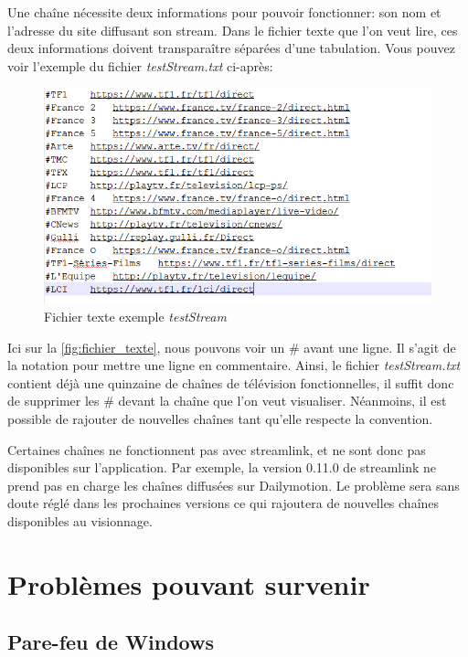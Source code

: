 \documentclass{polytech/polytech}
\begin{document}
Une chaîne nécessite deux informations pour pouvoir fonctionner: son nom et l'adresse du site diffusant son stream. Dans le fichier texte que l'on veut lire, ces deux informations doivent transparaître séparées d'une tabulation. Vous pouvez voir l'exemple du fichier \textit{testStream.txt} ci-après:

\begin{figure}
	\includegraphics[scale=0.7]{images/testStream.png}
	\caption{Fichier texte exemple \textit{testStream}}
	\label{fig:fichier_texte}
\end{figure}

Ici sur la \autoref{fig:fichier_texte}, nous pouvons voir un \# avant une ligne. Il s'agit de la notation pour mettre une ligne en commentaire. Ainsi, le fichier \textit{testStream.txt} contient déjà une quinzaine de chaînes de télévision fonctionnelles, il suffit donc de supprimer les \# devant la chaîne que l'on veut visualiser. Néanmoins, il est possible de rajouter de nouvelles chaînes tant qu'elle respecte la convention. 

Certaines chaînes ne fonctionnent pas avec streamlink, et ne sont donc pas disponibles sur l'application. Par exemple, la version 0.11.0 de streamlink ne prend pas en charge les chaînes diffusées sur Dailymotion. Le problème sera sans doute réglé dans les prochaines versions ce qui rajoutera de nouvelles chaînes disponibles au visionnage. 


\section{Problèmes pouvant survenir}



\subsection{Pare-feu de Windows}
\end{document}
